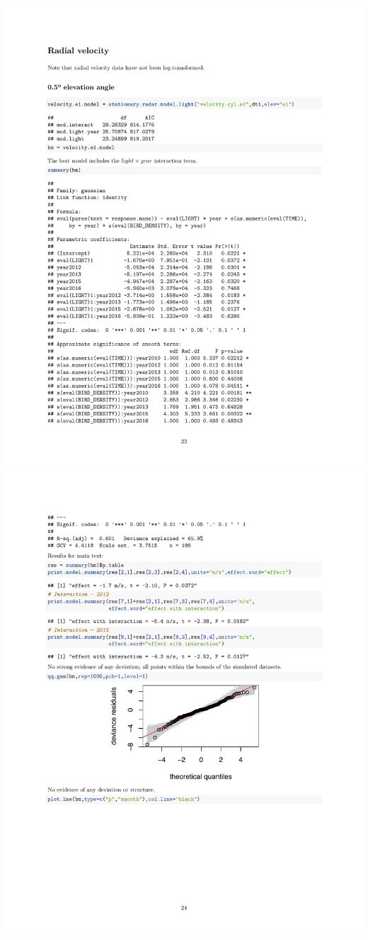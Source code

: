 \documentclass[a4paper, twoside]{templates/ociamthesis}
\begin{document}
\includegraphics[width=1\linewidth]{pdf_chapters/lights/lights_supp_crop_Part57}
\includegraphics[width=1\linewidth]{pdf_chapters/lights/lights_supp_crop_Part58}
\end{document}
